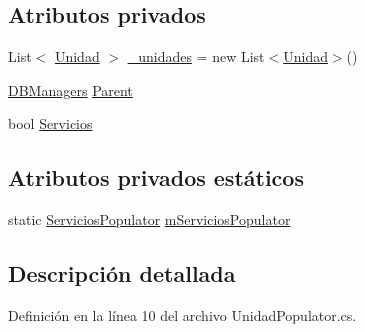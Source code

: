 \subsection*{Atributos privados}
\begin{DoxyCompactItemize}
\item 
List$<$ \hyperlink{class_proyecto___integrador__3_1_1_tipos_dato_1_1_unidad}{Unidad} $>$ \hyperlink{class_proyecto___integrador__3_1_1_d_b_managers_1_1_unidad_populator_a0704f72a36a446b2f4643226b9eb5917}{\-\_\-unidades} = new List$<$\hyperlink{class_proyecto___integrador__3_1_1_tipos_dato_1_1_unidad}{Unidad}$>$()
\item 
\hyperlink{class_proyecto___integrador__3_1_1_d_b_managers}{D\-B\-Managers} \hyperlink{class_proyecto___integrador__3_1_1_d_b_managers_1_1_unidad_populator_af564e36862498316aa1c5483c7cd8bc1}{Parent}
\item 
bool \hyperlink{class_proyecto___integrador__3_1_1_d_b_managers_1_1_unidad_populator_afe3e8b71dfc129ff61be9e8378403d60}{Servicios}
\end{DoxyCompactItemize}
\subsection*{Atributos privados estáticos}
\begin{DoxyCompactItemize}
\item 
static \hyperlink{class_proyecto___integrador__3_1_1_d_b_managers_1_1_servicios_populator}{Servicios\-Populator} \hyperlink{class_proyecto___integrador__3_1_1_d_b_managers_1_1_unidad_populator_a415439e84a77c50a90a5796f8f0e646d}{m\-Servicios\-Populator}
\end{DoxyCompactItemize}


\subsection{Descripción detallada}


Definición en la línea 10 del archivo Unidad\-Populator.\-cs.



